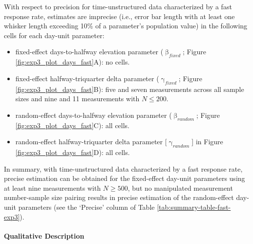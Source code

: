 \documentclass[
12pt, %
twoside,
english]{guelphthesis}
\begin{document}
With respect to precision for time-unstructured data characterized by a fast response rate, estimates are imprecise (i.e., error bar length with at least one whisker length exceeding 10\% of a parameter's population value) in the following cells for each day-unit parameter:
\begin{itemize}
\tightlist
\item
  fixed-effect days-to-halfway elevation parameter (\(\upbeta_{fixed}\); Figure \ref{fig:exp3_plot_days_fast}A): no cells.
\item
  fixed-effect halfway-triquarter delta parameter (\(\upgamma_{fixed}\); Figure \ref{fig:exp3_plot_days_fast}B): five and seven measurements across all sample sizes and nine and 11 measurements with \(N \le 200\).
\item
  random-effect days-to-halfway elevation parameter (\(\upbeta_{random}\); Figure \ref{fig:exp3_plot_days_fast}C): all cells.
\item
  random-effect halfway-triquarter delta parameter {[}\(\upgamma_{random}\){]} in Figure \ref{fig:exp3_plot_days_fast}D): all cells.
\end{itemize}
In summary, with time-unstructured data characterized by a fast response rate, precise estimation can be obtained for the fixed-effect day-unit parameters using at least nine measurements with \(N \ge 500\), but no manipulated measurement number-sample size pairing results in precise estimation of the random-effect day-unit parameters (see the `Precise' column of Table \ref{tab:summary-table-fast-exp3}).

\hypertarget{qualitative-fast-exp3}{%
\paragraph{Qualitative Description}\label{qualitative-fast-exp3}}
\end{document}
